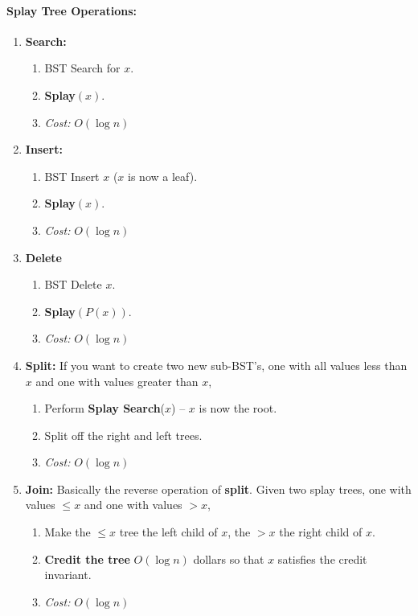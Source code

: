 \documentclass[a4paper,12pt]{report}
\begin{document}
\paragraph{Splay Tree Operations: } 
\begin{enumerate}
\item \textbf{Search: } 
\begin{enumerate}
\item BST Search for $x$.
\item \textbf{Splay}$(x)$.
\item \textit{Cost: } $O(\log n)$
\end{enumerate}

\item \textbf{Insert: } 
\begin{enumerate}
\item BST Insert $x$ ($x$ is now a leaf).
\item \textbf{Splay}$(x)$.
\item \textit{Cost: } $O(\log n)$
\end{enumerate}

\item \textbf{Delete} 
\begin{enumerate}
\item BST Delete $x$.
\item \textbf{Splay}$(P(x))$.
\item \textit{Cost: } $O(\log n)$
\end{enumerate}

\item \textbf{Split: } If you want to create two new sub-BST's, one with all values less than $x$ and one with values greater than $x$,
\begin{enumerate}
\item Perform \textbf{Splay Search}($x$) -- $x$ is now the root.
\item Split off the right and left trees.
\item \textit{Cost: } $O(\log n)$
\end{enumerate}


\item \textbf{Join: } Basically the reverse operation of \textbf{split}. Given two splay trees, one with values $\leq x$ and one with values $> x$,
\begin{enumerate}
\item Make the $\leq x$ tree the left child of $x$, the $> x$ the right child of $x$.
\item \textbf{Credit the tree} $O(\log n)$ dollars so that $x$ satisfies the credit invariant.
\item \textit{Cost: } $O(\log n)$
\end{enumerate}
\end{enumerate}
\end{document}
